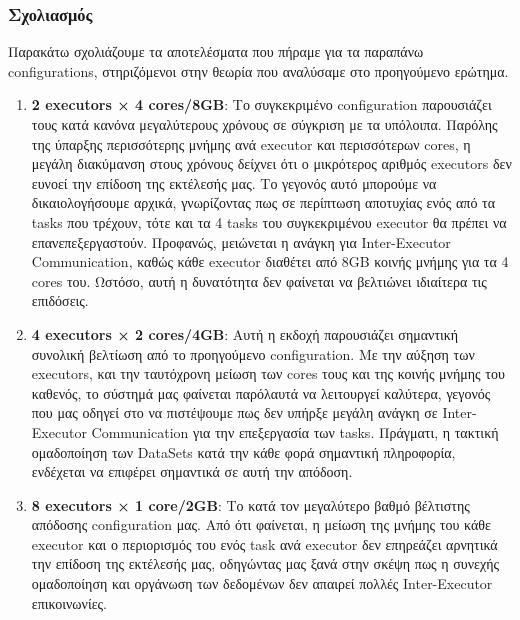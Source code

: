 \documentclass{article}
\begin{document}
\subsubsection*{ Σχολιασμός }
Παρακάτω σχολιάζουμε τα αποτελέσματα που πήραμε για τα παραπάνω configurations, στηριζόμενοι στην θεωρία που αναλύσαμε στο προηγούμενο ερώτημα. 
\begin{enumerate}
	\item \textbf{2 executors × 4 cores/8GB}: Το συγκεκριμένο configuration παρουσιάζει τους κατά κανόνα μεγαλύτερους χρόνους σε σύγκριση με τα υπόλοιπα. Παρόλης της ύπαρξης περισσότερης μνήμης ανά executor και περισσότερων cores, η μεγάλη διακύμανση στους χρόνους δείχνει ότι ο μικρότερος αριθμός executors δεν ευνοεί την επίδοση της εκτέλεσής μας. Το γεγονός αυτό μπορούμε να δικαιολογήσουμε αρχικά, γνωρίζοντας πως σε περίπτωση αποτυχίας ενός από τα tasks που τρέχουν, τότε και τα 4 tasks του συγκεκριμένου executor θα πρέπει να επανεπεξεργαστούν. Προφανώς, μειώνεται η ανάγκη για Inter-Executor Communication, καθώς κάθε executor διαθέτει από 8GB κοινής μνήμης για τα 4 cores του. Ωστόσο, αυτή η δυνατότητα δεν φαίνεται να βελτιώνει ιδιαίτερα τις επιδόσεις. 
	\item \textbf{4 executors × 2 cores/4GB}: Αυτή η εκδοχή παρουσιάζει σημαντική συνολική βελτίωση από το προηγούμενο configuration. Με την αύξηση των executors, και την ταυτόχρονη μείωση των cores τους και της κοινής μνήμης του καθενός, το σύστημά μας φαίνεται παρόλαυτά να λειτουργεί καλύτερα, γεγονός που μας οδηγεί στο να πιστέψουμε πως δεν υπήρξε μεγάλη ανάγκη σε Inter-Executor Communication για την επεξεργασία των tasks. Πράγματι, η τακτική ομαδοποίηση των DataSets κατά την κάθε φορά σημαντική πληροφορία, ενδέχεται να επιφέρει σημαντικά σε αυτή την απόδοση. 
	\item \textbf{8 executors × 1 core/2GB}: Το κατά τον μεγαλύτερο βαθμό βέλτιστης απόδοσης configuration μας. Από ότι φαίνεται, η μείωση της μνήμης του κάθε executor και ο περιορισμός του ενός task ανά executor δεν επηρεάζει αρνητικά την επίδοση της εκτέλεσής μας, οδηγώντας μας ξανά στην σκέψη πως η συνεχής ομαδοποίηση και οργάνωση των δεδομένων δεν απαιρεί πολλές Inter-Executor επικοινωνίες. 
\end{enumerate}
\end{document}
